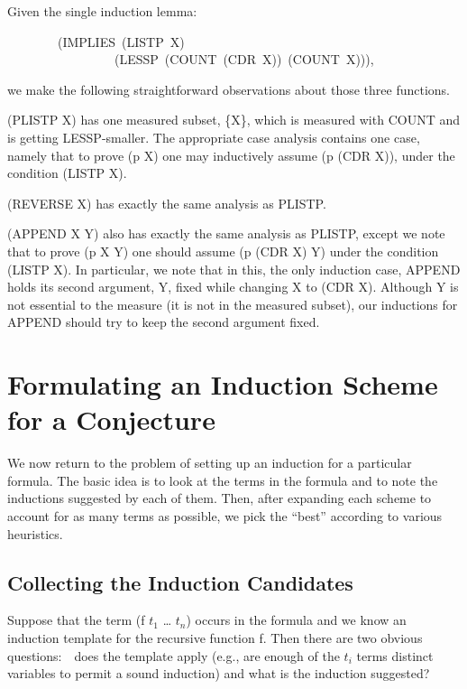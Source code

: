 \documentclass[11pt]{book}
\newenvironment{pubasis}{\begin{flushleft}\ttfamily\small}{\normalsize\rmfamily\end{flushleft}}
\newcommand{\pubdefaulttextsize}{\large}
\begin{document}
Given the single induction lemma:
\begin{pubasis}
~~~~~~~~(IMPLIES~(LISTP~X)\\
~~~~~~~~~~~~~~~~~(LESSP~(COUNT~(CDR~X))~(COUNT~X))),\\
\end{pubasis}
we make
the following straightforward observations about those three functions.

(PLISTP X) has one measured subset, \{X\}, which is measured with COUNT
and is getting LESSP-smaller.  The appropriate case analysis contains
one case, namely that to prove (p X) one may inductively assume (p (CDR X)),
under the condition (LISTP X).

(REVERSE X) has exactly the same analysis as PLISTP.

(APPEND X Y) also has exactly the same analysis as PLISTP, except
we note that to prove (p X Y) one should assume (p (CDR X) Y) under the
condition (LISTP X).  In particular, we note that in this, the only induction case,
APPEND holds its second argument, Y, fixed while changing X to (CDR X).
Although Y is not essential to the measure (it is not in the
measured subset), our inductions for APPEND should try to keep
the second argument fixed.
\chapter{Formulating an Induction Scheme for a Conjecture}
\label{SECINDUCTION}
\pubdefaulttextsize
We now return to the problem of setting up an induction for a particular
formula.  The basic idea is to look at the terms in the formula
and to note the inductions suggested by each of them.  Then, after expanding
each scheme to account for as many terms as
possible, we  pick the ``best'' according to various heuristics.
\section{Collecting the Induction Candidates}
\pubdefaulttextsize
Suppose that the term (f $t_{1}$ \ldots{} $t_{n}$) occurs in the formula
and we know an induction template for the recursive function f.  Then
there are two obvious questions:~~does the template  apply
(e.g., are enough of the  $t_{i}$ terms distinct variables to permit a sound induction)
and what is the induction suggested?
\end{document}

